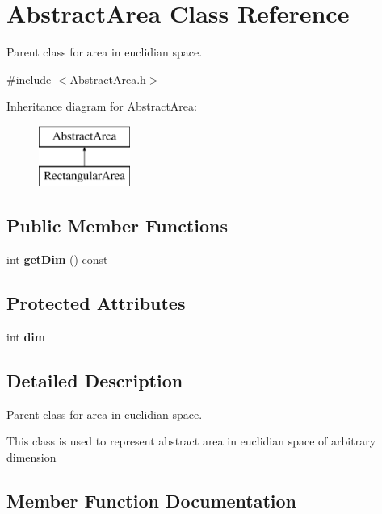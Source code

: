 \section{Abstract\+Area Class Reference}
\label{class_abstract_area}


Parent class for area in euclidian space.  




{\ttfamily \#include $<$Abstract\+Area.\+h$>$}

Inheritance diagram for Abstract\+Area\+:\begin{figure}[H]
\begin{center}
\leavevmode
\includegraphics[height=2.000000cm]{class_abstract_area}
\end{center}
\end{figure}
\subsection*{Public Member Functions}
\begin{DoxyCompactItemize}
\item 
int \textbf{ get\+Dim} () const
\end{DoxyCompactItemize}
\subsection*{Protected Attributes}
\begin{DoxyCompactItemize}
\item 
\mbox{\label{class_abstract_area_a23e4a4c2637f2dca6aeeb4895d0d8735}} 
int {\bfseries dim}
\end{DoxyCompactItemize}


\subsection{Detailed Description}
Parent class for area in euclidian space. 

This class is used to represent abstract area in euclidian space of arbitrary dimension 

\subsection{Member Function Documentation}
\mbox{\label{class_abstract_area_a30ba3f8f1414674723061bee3bc7c0cc}} 
